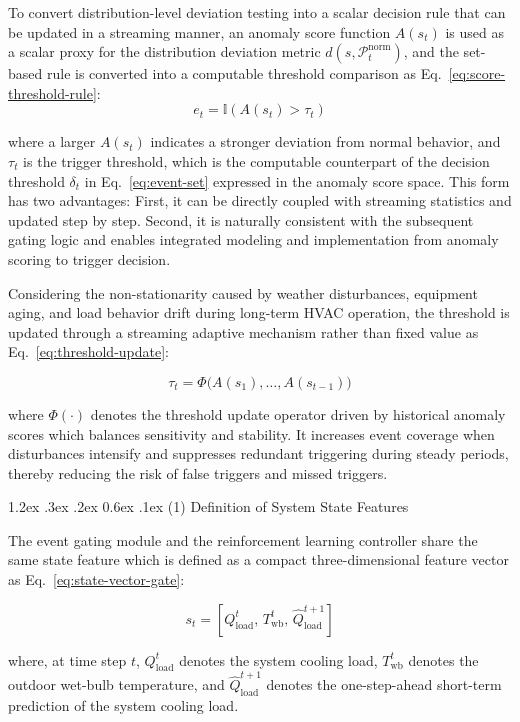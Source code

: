 \documentclass[preprint,12pt,number]{elsarticle}
\makeatletter
\renewcommand\paragraph{\@startsection{paragraph}{4}{\z@}%
  {1.2ex \@plus .3ex \@minus .2ex}%
  {0.6ex \@plus .1ex}%
  {\normalfont\normalsize}}
\makeatother
\begin{document}
To convert distribution-level deviation testing into a scalar decision rule that can be updated in a streaming manner, an anomaly score function \(A(s_t)\) is used as a scalar proxy for the distribution deviation metric \(d(s,\mathcal{P}^{\text{norm}}_t)\), and the set-based rule is converted into a computable threshold comparison as Eq.~\eqref{eq:score-threshold-rule}: \[
e_t=\mathbb{I}(A(s_t)>\tau_t) \tag{2}\label{eq:score-threshold-rule}
\]

\noindent where a larger \(A(s_t)\) indicates a stronger deviation from normal behavior, and \(\tau_t\) is the trigger threshold, which is the computable counterpart of the decision threshold \(\delta_t\) in Eq.~\eqref{eq:event-set} expressed in the anomaly score space. This form has two advantages: First, it can be directly coupled with streaming statistics and updated step by step. Second, it is naturally consistent with the subsequent gating logic and enables integrated modeling and implementation from anomaly scoring to trigger decision.

Considering the non-stationarity caused by weather disturbances, equipment aging, and load behavior drift during long-term HVAC operation, the threshold is updated through a streaming adaptive mechanism rather than fixed value as Eq.~\eqref{eq:threshold-update}:

\[
    \tau_t=\Phi\big(A(s_{1}),\ldots,A(s_{t-1})\big) \tag{3}\label{eq:threshold-update}
\]

\noindent where \(\Phi(\cdot)\) denotes the threshold update operator driven by historical anomaly scores which balances sensitivity and stability. It increases event coverage when disturbances intensify and suppresses redundant triggering during steady periods, thereby reducing the risk of false triggers and missed triggers.

\paragraph{(1) Definition of System State Features}\label{definition-of-system-state-features}

The event gating module and the reinforcement learning controller share the same state feature which is defined as a compact three-dimensional feature vector as Eq.~\eqref{eq:state-vector-gate}:

\[s_t=[Q_{\mathrm{load}}^t,\,T_{\mathrm{wb}}^t,\,\hat{Q}_{\mathrm{load}}^{t+1}] \tag{4}\label{eq:state-vector-gate}\]

\noindent where, at time step \(t\), \(Q_{\mathrm{load}}^t\) denotes the system cooling load, \(T_{\mathrm{wb}}^t\) denotes the outdoor wet-bulb temperature, and \(\hat{Q}_{\mathrm{load}}^{t+1}\) denotes the one-step-ahead short-term prediction of the system cooling load.
\end{document}
